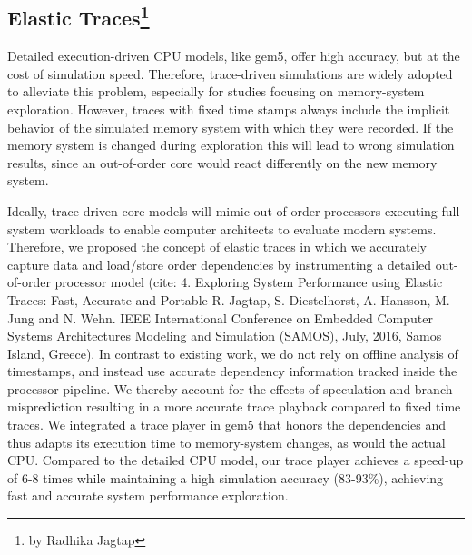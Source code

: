 \subsection[Elastic Traces]{Elastic Traces\footnote{by Radhika Jagtap}}

Detailed execution-driven CPU models, like gem5, offer high accuracy, but at the cost of simulation speed.
Therefore, trace-driven simulations are widely adopted to alleviate this problem, especially for studies focusing on memory-system exploration.
However, traces with fixed time stamps always include the implicit behavior of the simulated memory system with which they were recorded.
If the memory system is changed during exploration this will lead to wrong simulation results, since an out-of-order core would react differently on the new memory system.

Ideally, trace-driven core models will mimic out-of-order processors executing full-system workloads to enable computer architects to evaluate modern systems.
Therefore, we proposed the concept of elastic traces in which we accurately capture data and load/store order dependencies by instrumenting a detailed out-of-order processor model (cite: 4.	Exploring System Performance using Elastic Traces: Fast, Accurate and Portable R. Jagtap, S. Diestelhorst, A. Hansson, M. Jung and N. Wehn. IEEE International Conference on Embedded Computer Systems Architectures Modeling and Simulation (SAMOS), July, 2016, Samos Island, Greece).
In contrast to existing work, we do not rely on offline analysis of timestamps, and instead use accurate dependency information tracked inside the processor pipeline.
We thereby account for the effects of speculation and branch misprediction resulting in a more accurate trace playback compared to fixed time traces.
We integrated a trace player in gem5 that honors the dependencies and thus adapts its execution time to memory-system changes, as would the actual CPU. Compared to the detailed CPU model, our trace player achieves a speed-up of 6-8 times while maintaining a high simulation accuracy (83-93\%), achieving fast and accurate system performance exploration.
